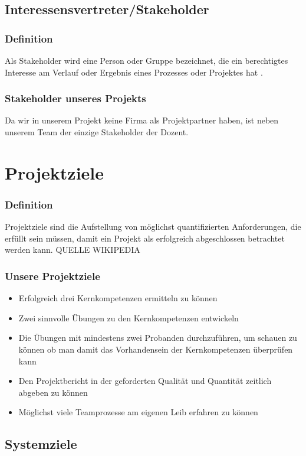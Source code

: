 \subsection{Interessensvertreter/Stakeholder}
\subsubsection{Definition}
Als Stakeholder wird eine Person oder Gruppe bezeichnet, die ein berechtigtes Interesse am Verlauf oder Ergebnis eines Prozesses oder Projektes hat \cite{wiki:Stakeholder}.

\subsubsection{Stakeholder unseres Projekts}
Da wir in unserem Projekt keine Firma als Projektpartner haben, ist neben unserem Team der einzige Stakeholder der Dozent. 
\section{Projektziele}
\subsubsection{Definition}
Projektziele sind die Aufstellung von möglichst quantifizierten Anforderungen, die erfüllt sein müssen, damit ein Projekt als erfolgreich abgeschlossen betrachtet werden kann. QUELLE WIKIPEDIA
\subsubsection{Unsere Projektziele}
\begin{itemize}
\item Erfolgreich drei Kernkompetenzen ermitteln zu können
\item Zwei sinnvolle Übungen zu den Kernkompetenzen entwickeln
\item Die Übungen mit mindestens zwei Probanden durchzuführen, um schauen zu können ob man damit das Vorhandensein der Kernkompetenzen überprüfen kann
\item Den Projektbericht in der geforderten Qualität und Quantität zeitlich abgeben zu können
\item Möglichst viele Teamprozesse am eigenen Leib erfahren zu können
\end{itemize} 

\subsection{Systemziele}
